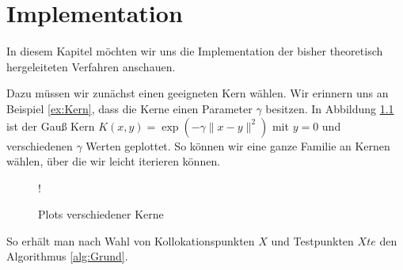 \chapter{Implementation}
\label{cha:Implementation}

In diesem Kapitel möchten wir uns die Implementation der bisher theoretisch hergeleiteten Verfahren anschauen.

Dazu müssen wir zunächst einen geeigneten Kern wählen. Wir erinnern uns an Beispiel \ref{ex:Kern}, dass die Kerne einen Parameter $\gamma$ besitzen. In Abbildung \ref{fig:Kerne} ist der Gauß Kern $K(x,y) = \exp\left(-\gamma \|x-y\|^2\right)$ mit $y= 0$ und verschiedenen $\gamma$ Werten geplottet. So können wir eine ganze Familie an Kernen wählen, über die wir leicht iterieren können.
\begin{figure}[h]
\centering
\resizebox {.65\columnwidth} {!} {

}
\caption{Plots verschiedener Kerne}
\label{fig:Kerne}
\end{figure}

So erhält man nach Wahl von Kollokationspunkten $X$ und Testpunkten $Xte$ den Algorithmus \ref{alg:Grund}.


